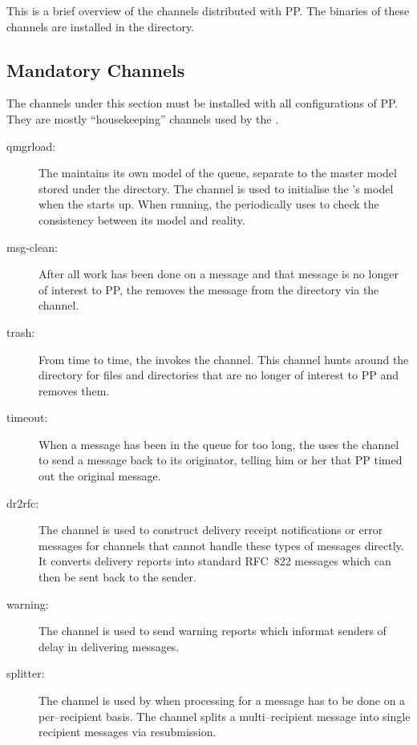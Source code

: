 This is a brief overview of the channels distributed with PP.
The binaries of these channels are installed in the 
directory.

\subsection {Mandatory Channels}

The channels under this section must be installed with all
configurations of PP.
They are mostly ``housekeeping'' channels used by the .

\begin{description}
\item[qmgrload:]
The  maintains its own model of the queue, separate to the
master model stored under the  directory.  The
 channel is used to initialise the 's model
when the  starts up.  When running, the 
periodically uses  to check the consistency between its
model and reality.

\item[msg-clean:]
After all work has been done on a message and that message is no
longer of interest to PP, the  removes the message from the
 directory via the  channel.

\item[trash:]
From time to time, the  invokes the  channel.
This channel hunts around the  directory for files and
directories that are no longer of interest to PP and removes them.

\item[timeout:]
When a message has been in the queue for too long, the  uses
the  channel to send a message back to its originator,
telling him or her that PP timed out the original message.

\item[dr2rfc:]
The  channel is used to construct delivery receipt
notifications or error messages for channels that cannot handle these
types of messages directly. It converts delivery reports into standard
RFC~822 messages which can then be sent back to the sender.

\item[warning:] The  channel is used to send warning reports
which informat senders of delay in delivering messages.

\item[splitter:] The  channel is used by  when
processing for a message has to be done on a per--recipient basis.
The  channel splits a multi--recipient message into
single recipient messages via resubmission.
\end{description}

